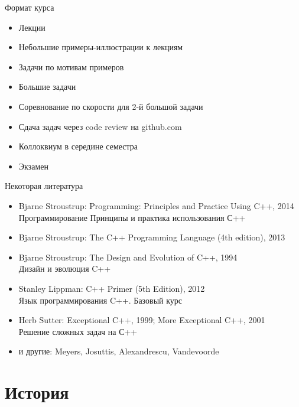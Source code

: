 \documentclass[unknownkeysallowed,xcolor=table]{beamer}
\begin{document}
\begin{frame}{Формат курса}
  \begin{itemize}
    \item Лекции \vspace{1em}
    \item Небольшие примеры-иллюстрации к лекциям \vspace{1em}
    \item Задачи по мотивам примеров \vspace{1em}
    \item Большие задачи \vspace{1em}
    \item Соревнование по скорости для 2-й большой задачи \vspace{1em}
    \item Сдача задач через code review на github.com \vspace{1em}
    \item Коллоквиум в середине семестра \vspace{1em}
    \item Экзамен
  \end{itemize}
\end{frame}

\begin{frame}{Некоторая литература}
  \begin{itemize}
    \item Bjarne Stroustrup: Programming: Principles and Practice Using C++, 2014\\Программирование Принципы и практика использования С++
    \item Bjarne Stroustrup: The C++ Programming Language (4th edition), 2013
    \item Bjarne Stroustrup: The Design and Evolution of C++, 1994\\Дизайн и эволюция C++
    \item Stanley Lippman: C++ Primer (5th Edition), 2012\\Язык программирования C++. Базовый курс
    \item Herb Sutter: Exceptional C++, 1999; More Exceptional C++, 2001\\Решение сложных задач на С++
    \item и другие: Meyers, Josuttis, Alexandrescu, Vandevoorde
  \end{itemize}
\end{frame}

\section{История}
\end{document}
